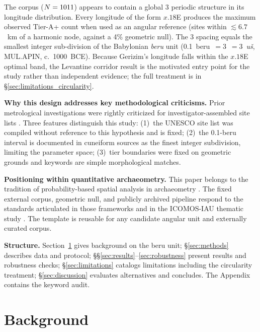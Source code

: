 \documentclass[HARVARD,twocolumn]{USG}
\begin{document}
The corpus ($N = 1011$) appears to contain a global
3\textdegree{} periodic structure in its longitude distribution.
Every longitude of the form $x.18$\textdegree{}E produces the maximum
observed Tier-A+ count when used as an angular reference (sites within
$\lesssim 6.7$~km of a harmonic node, against a 4\% geometric null).
The 3\textdegree{} spacing equals the smallest integer sub-division of
the Babylonian \textit{beru} unit
(0.1~beru~$= 3$\textdegree{}~$= 3$~\textit{u\v{s}}, MUL.APIN, c.~1000~BCE).
Because Gerizim's longitude falls within the $x.18$\textdegree{}E optimal
band, the Levantine corridor result is the motivated entry point for the study
rather than independent evidence; the full treatment is in
\S\ref{sec:limitations_circularity}.
\label{sec:circularity}

\textbf{Why this design addresses key methodological criticisms.}
Prior metrological investigations were rightly criticized for investigator-assembled
site lists \citep{williamson1983leylines,freeman1976,kendall1974}.
Three features distinguish this study: (1)~the UNESCO site list was compiled
without reference to this hypothesis and is fixed; (2)~the 0.1-beru interval
is documented in cuneiform sources \citep{hunger2019mul} as the finest
integer subdivision, limiting the parameter space; (3)~tier boundaries
were fixed on geometric grounds and keywords are simple morphological matches.

\textbf{Positioning within quantitative archaeometry.}
This paper belongs to the tradition of probability-based spatial analysis in
archaeometry \citep{magli2013,magli2016,ruggles1999astronomy,ruggles2015handbook,silva2020statistical}.
The fixed external corpus, geometric null, and publicly archived pipeline respond to
the standards articulated in those frameworks and in the ICOMOS-IAU thematic study
\citep{ruggles2010icomos}. The template is reusable for any candidate angular unit
and externally curated corpus.

\textbf{Structure.}
Section~\ref{sec:prior} gives background on the beru unit;
\S\ref{sec:methods} describes data and protocol;
\S\S\ref{sec:results}--\ref{sec:robustness} present results and robustness checks;
\S\ref{sec:limitations} catalogs limitations including the circularity treatment;
\S\ref{sec:discussion} evaluates alternatives and concludes.
The Appendix contains the keyword audit.

\section{Background}
\label{sec:prior}
\end{document}
